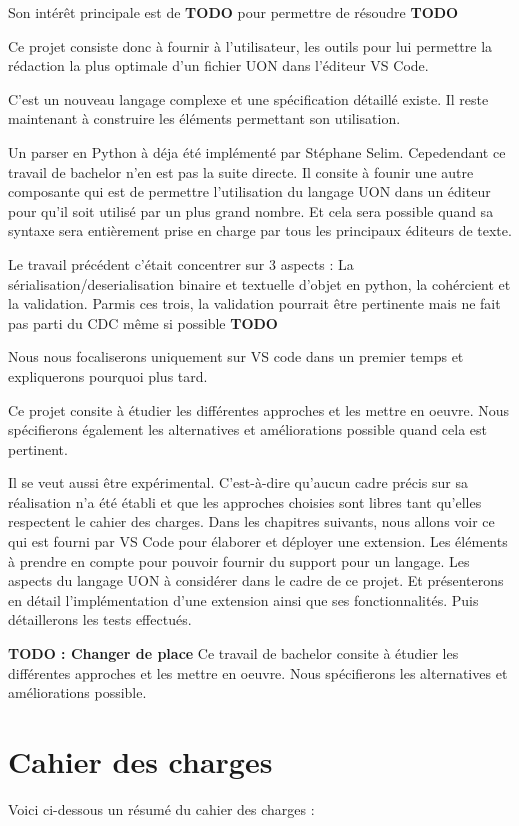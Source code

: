 \documentclass[
    iict, %
    il, %
]{heig-tb}
\begin{document}
Son intérêt principale est de \textbf{TODO} pour permettre de résoudre  \textbf{TODO}

Ce projet consiste donc à fournir à l'utilisateur, les outils pour lui permettre la rédaction la plus optimale d'un fichier UON
dans l'éditeur VS Code.

C'est un nouveau langage complexe et une spécification détaillé existe. Il reste maintenant à construire les éléments permettant son utilisation.

Un parser en Python à déja été implémenté par Stéphane Selim. Cepedendant ce travail de bachelor n'en est pas la suite directe.
Il consite à founir une autre composante qui est de permettre l'utilisation du langage UON dans un éditeur pour qu'il soit utilisé par un plus grand nombre.
Et cela sera possible quand sa syntaxe sera entièrement prise en charge par tous les principaux éditeurs de texte.

Le travail précédent c'était concentrer sur 3 aspects : La sérialisation/deserialisation binaire et textuelle d'objet en python, la cohércient et la validation.
Parmis ces trois, la validation pourrait être pertinente mais ne fait pas parti du CDC même si possible \textbf{TODO}

Nous nous focaliserons uniquement sur VS code dans un premier temps et expliquerons pourquoi plus tard.

Ce projet consite à étudier les différentes approches et les mettre en oeuvre. Nous spécifierons également les alternatives et améliorations possible quand cela est pertinent.

Il se veut aussi être expérimental. C'est-à-dire qu'aucun cadre précis sur sa réalisation n'a été établi et que les approches choisies sont libres tant qu'elles respectent le cahier des charges.
Dans les chapitres suivants, nous allons voir ce qui est fourni par VS Code pour élaborer et déployer une extension.
Les éléments à prendre en compte pour pouvoir fournir du support pour un langage.
Les aspects du langage UON à considérer dans le cadre de ce projet.
Et présenterons en détail l'implémentation d'une extension ainsi que ses fonctionnalités. Puis détaillerons les tests effectués.

\textbf{TODO : Changer de place}
Ce travail de bachelor consite à étudier les différentes approches et les mettre en oeuvre. Nous spécifierons les alternatives et améliorations possible.

\let\cleardoublepage\clearpage

\chapter{Cahier des charges}
Voici ci-dessous un résumé du cahier des charges :
\end{document}
